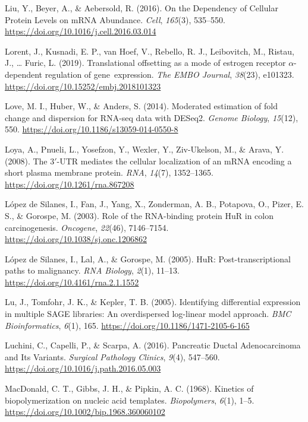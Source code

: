 \documentclass[12pt,openany]{book}
\begin{document}
\hypertarget{ref-Liu2016}{}
Liu, Y., Beyer, A., \& Aebersold, R. (2016). On the Dependency of
Cellular Protein Levels on mRNA Abundance. \emph{Cell}, \emph{165}(3),
535--550. \url{https://doi.org/10.1016/j.cell.2016.03.014}

\hypertarget{ref-Lorent2019}{}
Lorent, J., Kusnadi, E. P., van Hoef, V., Rebello, R. J., Leibovitch,
M., Ristau, J., \ldots{} Furic, L. (2019). Translational offsetting as a
mode of estrogen receptor \(\alpha\)-dependent regulation of
gene~expression. \emph{The EMBO Journal}, \emph{38}(23), e101323.
\url{https://doi.org/10.15252/embj.2018101323}

\hypertarget{ref-Love2014}{}
Love, M. I., Huber, W., \& Anders, S. (2014). Moderated estimation of
fold change and dispersion for RNA-seq data with DESeq2. \emph{Genome
Biology}, \emph{15}(12), 550.
\url{https://doi.org/10.1186/s13059-014-0550-8}

\hypertarget{ref-Loya2008}{}
Loya, A., Pnueli, L., Yosefzon, Y., Wexler, Y., Ziv-Ukelson, M., \&
Arava, Y. (2008). The 3\({'}\)-UTR mediates the cellular localization of
an mRNA encoding a short plasma membrane protein. \emph{RNA},
\emph{14}(7), 1352--1365. \url{https://doi.org/10.1261/rna.867208}

\hypertarget{ref-LopezdeSilanes2003}{}
López de Silanes, I., Fan, J., Yang, X., Zonderman, A. B., Potapova, O.,
Pizer, E. S., \& Gorospe, M. (2003). Role of the RNA-binding protein HuR
in colon carcinogenesis. \emph{Oncogene}, \emph{22}(46), 7146--7154.
\url{https://doi.org/10.1038/sj.onc.1206862}

\hypertarget{ref-LopezdeSilanes2005}{}
López de Silanes, I., Lal, A., \& Gorospe, M. (2005). HuR:
Post-transcriptional paths to malignancy. \emph{RNA Biology},
\emph{2}(1), 11--13. \url{https://doi.org/10.4161/rna.2.1.1552}

\hypertarget{ref-Lu2005}{}
Lu, J., Tomfohr, J. K., \& Kepler, T. B. (2005). Identifying
differential expression in multiple SAGE libraries: An overdispersed
log-linear model approach. \emph{BMC Bioinformatics}, \emph{6}(1), 165.
\url{https://doi.org/10.1186/1471-2105-6-165}

\hypertarget{ref-Luchini2016}{}
Luchini, C., Capelli, P., \& Scarpa, A. (2016). Pancreatic Ductal
Adenocarcinoma and Its Variants. \emph{Surgical Pathology Clinics},
\emph{9}(4), 547--560. \url{https://doi.org/10.1016/j.path.2016.05.003}

\hypertarget{ref-MacDonald1968}{}
MacDonald, C. T., Gibbs, J. H., \& Pipkin, A. C. (1968). Kinetics of
biopolymerization on nucleic acid templates. \emph{Biopolymers},
\emph{6}(1), 1--5. \url{https://doi.org/10.1002/bip.1968.360060102}
\end{document}
